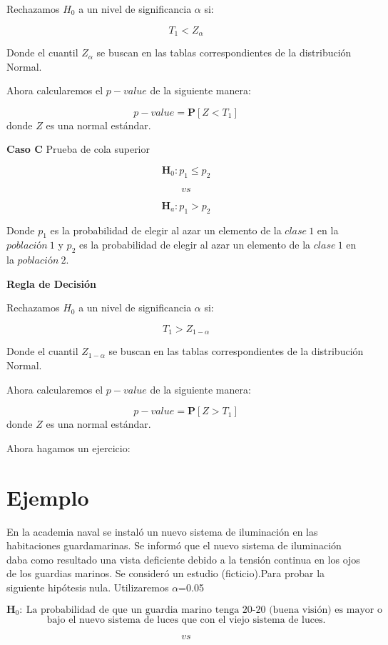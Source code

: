 \documentclass[
  a4paper,
  oneside,
  openany]{book}
\begin{document}
Rechazamos \(H_0\) a un nivel de significancia \(\alpha\) si:

\[T_{1}< Z_{\alpha}\]

Donde el cuantil \(Z_{\alpha}\) se buscan en las tablas correspondientes de la distribución Normal.

Ahora calcularemos el \(p-value\) de la siguiente manera:

\[p-value=\mathbf{P}[Z<T_{1}]\]
donde \(Z\) es una normal estándar.

\textbf{Caso C} Prueba de cola superior

\[\textbf{H}_0: p_{1} \leq p_{2}\]

\[vs\]

\[\textbf{H}_a: p_{1} > p_{2}\]

Donde \(p_{1}\) es la probabilidad de elegir al azar un elemento de la \(clase\ 1\) en la \(población\ 1\) y \(p_{2}\) es la probabilidad de elegir al azar un elemento de la \(clase\ 1\) en la \(población\ 2\).

\textbf{Regla de Decisión}

Rechazamos \(H_0\) a un nivel de significancia \(\alpha\) si:

\[T_{1} > Z_{1-\alpha}\]

Donde el cuantil \(Z_{1-\alpha}\) se buscan en las tablas correspondientes de la distribución Normal.

Ahora calcularemos el \(p-value\) de la siguiente manera:

\[p-value=\mathbf{P}[Z>T_{1}]\]
donde \(Z\) es una normal estándar.

Ahora hagamos un ejercicio:

\hypertarget{ejemplo-9}{%
\section{Ejemplo}\label{ejemplo-9}}

En la academia naval se instaló un nuevo sistema de iluminación en las habitaciones guardamarinas. Se informó que el nuevo sistema de iluminación daba como resultado una vista deficiente debido a la tensión continua en los ojos de los guardias marinos. Se consideró un estudio (ficticio).Para probar la siguiente hipótesis nula. Utilizaremos \(\alpha\)=0.05

\[\textbf{H}_0: \ \mbox{La probabilidad de que un guardia marino tenga 20-20 (buena visión) es mayor o igual}\]
\[\mbox{bajo el nuevo sistema de luces que con el viejo sistema de luces.}\]

\[vs\]
\end{document}
